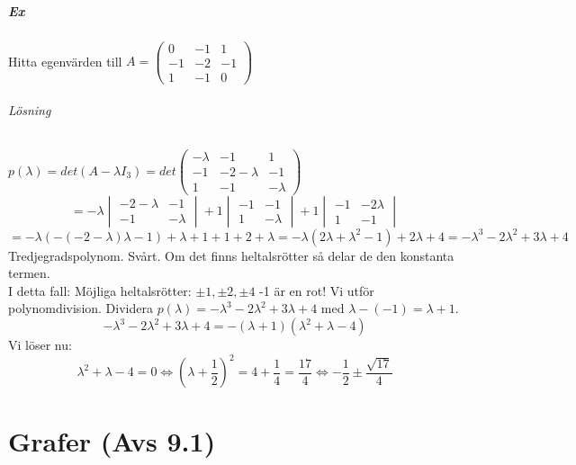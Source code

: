 \paragraph{Ex} Hitta egenvärden till $A=\begin{pmatrix}
    0&-1&1\\
    -1&-2&-1\\
    1&-1&0
\end{pmatrix}$
\subparagraph{Lösning} $p(\lambda)=det(A-\lambda I_3)=det\begin{pmatrix}
    -\lambda&-1&1\\
    -1&-2-\lambda&-1\\
    1&-1&-\lambda
\end{pmatrix}$\\
\begin{equation*}
    =-\lambda\begin{vmatrix}
        -2-\lambda&-1\\-1&-\lambda
    \end{vmatrix}
    +1\begin{vmatrix}
        -1&-1\\1&-\lambda
    \end{vmatrix}
    +1\begin{vmatrix}
        -1&-2\lambda\\
        1&-1
    \end{vmatrix}
\end{equation*}
\begin{equation*}
    =-\lambda(-(-2-\lambda)\lambda-1)+\lambda+1+1+2+\lambda
    =-\lambda(2\lambda+\lambda^2-1)+2\lambda+4
    =-\lambda^3-2\lambda^2+3\lambda+4
\end{equation*}
Tredjegradspolynom. Svårt.
Om det finns heltalsrötter så delar de den konstanta termen.\\
I detta fall: Möjliga heltalsrötter: $\pm 1,\pm 2, \pm 4$ -1 är en rot!
Vi utför polynomdivision.
Dividera $p(\lambda)=-\lambda^3-2\lambda^2+3\lambda+4$ med $\lambda-(-1)=\lambda+1$.
\begin{equation*}
    -\lambda^3-2\lambda^2+3\lambda+4=-(\lambda+1)(\lambda^2+\lambda-4)
\end{equation*}
Vi löser nu:
\begin{equation*}
    \lambda^2+\lambda-4=0
    \Leftrightarrow
    (\lambda+\frac{1}{2})^2=4+\frac{1}{4}=\frac{17}{4}
    \Leftrightarrow
    -\frac{1}{2}\pm \frac{\sqrt{17}}{4}
\end{equation*}

\chapter{Grafer (Avs 9.1)}

